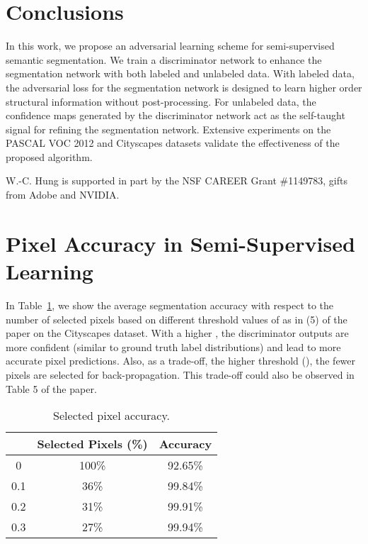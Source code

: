 \documentclass{bmvc2k}
\begin{document}
	\vspace{-4mm}
	\section{Conclusions}
	\vspace{-3mm}
	In this work, we propose an adversarial learning scheme for semi-supervised semantic segmentation.
We train a discriminator network to enhance the segmentation network with both labeled and unlabeled data. With labeled data, the adversarial loss for the segmentation network is designed to learn higher order structural information without post-processing.
For unlabeled data, the confidence maps generated by the discriminator network act as the self-taught signal for refining the segmentation network.
Extensive experiments on the PASCAL VOC 2012 and Cityscapes datasets validate the effectiveness of the proposed algorithm.
	
	{}
	W.-C. Hung is supported in part by the NSF CAREER Grant \#1149783, gifts from Adobe and NVIDIA.
	
	
	
	\clearpage
	\appendix
	
	\section{Pixel Accuracy in Semi-Supervised Learning}
	
	In Table~\ref{table:secmi_acc}, we show the average segmentation accuracy with respect to the number of selected pixels based on different threshold values of  as in (5) of the paper on the Cityscapes dataset. 
With a higher , the discriminator outputs are more confident (similar to ground truth label distributions) and lead to more accurate pixel predictions.
Also, as a trade-off, the higher threshold (), the fewer pixels are selected for back-propagation. This trade-off could also be observed in Table 5 of the paper.
	
	\begin{table}[h]
		\caption{Selected pixel accuracy.}
		\centering
		\label{table:secmi_acc}
		\begin{tabular}{c|c|c}
			\toprule
			 & Selected Pixels (\%) & Accuracy \\
			\midrule
			0 & 100\% & 92.65\%\\
			0.1 & 36\% & 99.84\% \\
			0.2 & 31\% & 99.91\% \\
			0.3 & 27\% & 99.94\% \\ 
			\bottomrule
		\end{tabular}
		
	\end{table}
\end{document}
